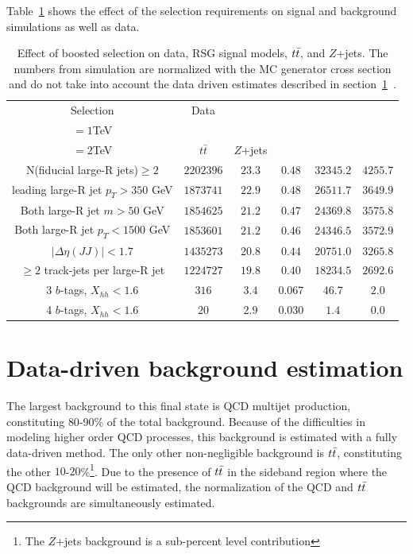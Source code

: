 Table~\ref{tab:4bcutflow} shows the effect of the selection requirements on signal and background simulations as well as data. 

\begin{table}[h!]
\centering
\captionsetup{justification=centering}

\hspace{-10pt}
\begin{tabular}{c|c|c|c|c|c}
Selection & Data & \specialcell{$m_{\Gkk}$ \\ $=1$TeV} & \specialcell{$m_{\Gkk}$\\ $=2$TeV} & $t\bar{t}$ & $Z$+jets \\
\hline
N(fiducial large-R jets)$\geq 2$ & $2202396$ & $23.3$ & $0.48$ & $32345.2$ & $4255.7$ \\
leading large-R jet $p_{T}>350$ GeV & $1873741$ & $22.9$ & $0.48$ & $26511.7$ & $3649.9$ \\
Both large-R jet $m>50$ GeV & $1854625$ & $21.2$ & $0.47$ & $24369.8$ & $3575.8$ \\
Both large-R jet $p_{T}<1500$ GeV & $1853601$ & $21.2$ & $0.46$ & $24346.5$ & $3572.9$ \\
$|\Delta\eta(JJ)|<1.7$ & $1435273$ & $20.8$ & $0.44$ & $20751.0$ & $3265.8$ \\
$\geq 2$ track-jets per large-R jet & $1224727$ & $19.8$ & $0.40$ & $18234.5$ & $2692.6$ \\
\hline
3 $b$-tags, $X_{hh}<1.6$ & $316$ & $3.4$ & $0.067$ & $46.7$ & $2.0$ \\
\hline
4 $b$-tags, $X_{hh}<1.6$ & $20$ & $2.9$ & $0.030$ & $1.4$ & $0.0$ \\
\hline
\end{tabular}

\caption{
Effect of boosted selection on data, RSG signal models, $t\bar{t}$, and $Z$+jets. The numbers from simulation are normalized with the MC generator cross section and do not take into account the data driven estimates described in section~\ref{sec:dd4b}~\cite{Qi}.
}
\label{tab:4bcutflow}
\end{table}

\section{Data-driven background estimation}
\label{sec:dd4b}

The largest background to this final state is QCD multijet production, constituting $80$-$90$\% of the total background. Because of the difficulties in modeling higher order QCD processes, this background is estimated with a fully data-driven method. The only other non-negligible background is $t\bar{t}$, constituting the other $10$-$20$\%\footnote{The $Z$+jets background is a sub-percent level contribution}.  Due to the presence of $t\bar{t}$ in the sideband region where the QCD background will be estimated, the normalization of the QCD and $t\bar{t}$ backgrounds are simultaneously estimated. 

